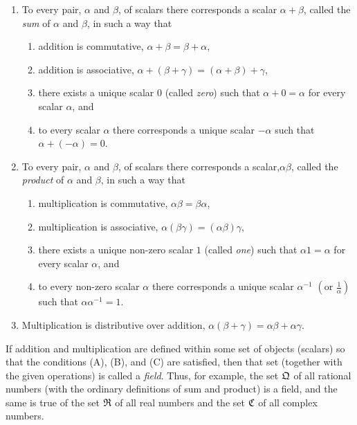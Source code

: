 \begin{enumerate}[label=(\Alph*)]
    \item To every pair, \(\alpha\) and \(\beta\), of scalars there corresponds
        a scalar \(\alpha + \beta\), called the \emph{sum} of \(\alpha\) and
        \(\beta\), in such a way that
    \begin{enumerate}[label=(\arabic*)]
        \item addition is commutative, \(\alpha + \beta = \beta + \alpha\),
        \item addition is associative, \(\alpha + (\beta + \gamma) =
            (\alpha + \beta) + \gamma\),
        \item there exists a unique scalar \(0\) (called \emph{zero}) such that
            \(\alpha + 0 = \alpha\) for every scalar \(\alpha\), and
        \item to every scalar \(\alpha\) there corresponds a unique scalar \(-\alpha\)
            such that \(\alpha + (-\alpha) = 0\).
    \end{enumerate}
    \smallskip
    \item To every pair, \(\alpha\) and \(\beta\), of scalars there corresponds
        a scalar,\(\alpha \beta\), called the \emph{product} of \(\alpha\) and
        \(\beta\), in such a way that
    \begin{enumerate}[label=(\arabic*)]
        \item multiplication is commutative, \(\alpha \beta = \beta \alpha\),
        \item multiplication is associative, \(\alpha (\beta \gamma) =
            (\alpha \beta) \gamma\),
        \item there exists a unique non-zero scalar \(1\) (called \emph{one}) such that
            \(\alpha 1 = \alpha\) for every scalar \(\alpha\), and
        \item to every non-zero scalar \(\alpha\) there corresponds a unique scalar
            \(\alpha^{-1}\) \(\displaystyle\left(\text{or }\frac{1}{\alpha}\right)\) such that \(\alpha \alpha^{-1} = 1\).
    \end{enumerate}
    \smallskip
    \item Multiplication is distributive over addition, \(\alpha (\beta + \gamma) =
        \alpha \beta + \alpha \gamma\).
\end{enumerate}

If addition and multiplication are defined within some set of objects (scalars)
so that the conditions (A), (B), and (C) are satisfied, then that set (together
with the given operations) is called a \emph{field}. Thus, for example, the set
\(\frak{Q}\) of all rational numbers (with the ordinary definitions of sum and
product) is a field, and the same is true of the set \(\frak{R}\) of all real numbers and
the set \(\frak{C}\) of all complex numbers.


